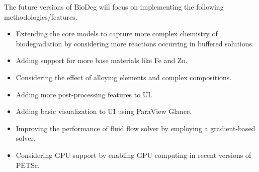 The future versions of BioDeg will focus on implementing the following methodologies/features.
\begin{itemize}
\item Extending the core models to capture more complex chemistry of biodegradation by considering more reactions occurring in buffered solutions.

\item Adding support for more base materials like Fe and Zn.

\item Considering the effect of alloying elements and complex compositions.

\item Adding more post-processing features to \biodeg{} UI.

\item Adding basic visualization to \biodeg{} UI using ParaView Glance.

\item Improving the performance of fluid flow solver by employing a gradient-based solver.

\item Considering GPU support by enabling GPU computing in recent versions of PETSc.

\end{itemize} 
